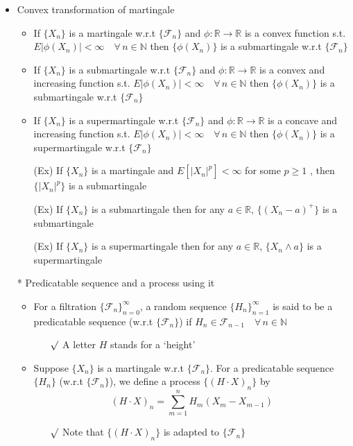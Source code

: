 \documentclass[12pt, A4]{article}
\newcommand{\rmk}{$\surd$}
\newcommand{\N}{\mathbb{N}}
\newcommand{\R}{\mathbb{R}}
\newcommand{\F}{\mathcal{F}}
\newcommand{\foranyn}{\quad \forall \, n\in \N}
\begin{document}
\begin{itemize}
	\item Convex transformation of martingale
	\begin{itemize}
		\item If $\{X_n\}$ is a martingale w.r.t $\{\F_n\}$ and $\phi:\R\rightarrow \R$ is a convex function s.t. \\$E|\phi(X_n)|<\infty\foranyn$ then $\{\phi(X_n)\}$ is a submartingale w.r.t $\{\F_n\}$
		\item If $\{X_n\}$ is a submartingale w.r.t $\{\F_n\}$ and $\phi:\R\rightarrow \R$ is a convex and increasing function s.t. $E|\phi(X_n)|<\infty\foranyn$ then $\{\phi(X_n)\}$ is a submartingale w.r.t $\{\F_n\}$
		\item If $\{X_n\}$ is a supermartingale w.r.t $\{\F_n\}$ and $\phi:\R\rightarrow \R$ is a concave and increasing function s.t. $E|\phi(X_n)|<\infty\foranyn$ then $\{\phi(X_n)\}$ is a supermartingale w.r.t $\{\F_n\}$
		\item[(Ex)] If $\{X_n\}$ is a martingale and $E[|X_n|^p]<\infty$ for some $p\geq1$ , then $\{|X_n|^p\}$ is a submartingale
		\item[(Ex)] If $\{X_n\}$ is a submartingale then for any $a\in \R$, $\{(X_n-a)^+\}$ is a submartingale 
		\item[(Ex)] If $\{X_n\}$ is a supermartingale then for any $a\in \R$, $\{X_n\wedge a\}$ is a supermartingale 
	\end{itemize}

	\item[*] Predicatable sequence and a process using it
	\begin{itemize}
		\item For a filtration $\{\F_n\}_{n=0}^\infty$, a random sequence $\{H_n\}_{n=1}^\infty$ is said to be a predicatable sequence (w.r.t $\{\F_n\}$) if $H_n\in \F_{n-1}\foranyn$
		\begin{itemize}
			\item[\rmk] A letter $H$ stands for a `height'
		\end{itemize}
		\item Suppose $\{X_n\}$ is a martingale w.r.t $\{\F_n\}$. For a predicatable sequence $\{H_n\}$ (w.r.t $\{\F_n\}$), we define a process $\{(H\cdot X)_n\}$ by $$(H\cdot X)_n=\sum_{m=1}^n H_m(X_m-X_{m-1}) $$
		\begin{itemize}
			\item[\rmk] Note that $\{(H\cdot X)_n\}$ is adapted to $\{\F_n\}$
		\end{itemize}
	\end{itemize}
	
	 



\end{itemize}
\end{document}
